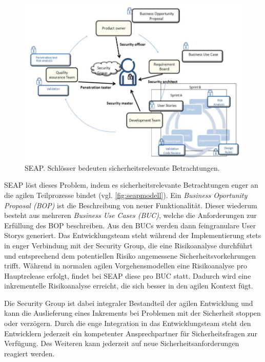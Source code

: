 \begin{figure}
  \centering
  \includegraphics[width=\textwidth]{img/seapmodell.png}
  \caption{SEAP. Schlösser bedeuten sicherheitsrelevante Betrachtungen. \parencite[][S. 14]{Baca:2015aa}}
  \label{fig:seapmodell}
\end{figure}

SEAP löst dieses Problem, indem es sicherheitsrelevante Betrachtungen enger an die agilen Teilprozesse bindet (vgl. \autoref{fig:seapmodell}).
Ein \emph{Business Oportunity Proposal (BOP)} ist die Beschreibung von neuer Funktionalität.
Dieser wiederum besteht aus mehreren \emph{Business Use Cases (BUC)}, welche die Anforderungen zur Erfüllung des BOP beschreiben.
Aus den BUCs werden dann feingranulare User Storys generiert.
Das Entwicklungsteam steht während der Implementierung stets in enger Verbindung mit der Security Group, die eine Risikoanalyse durchführt und entsprechend dem potentiellen Risiko angemessene Sicherheitsvorkehrungen trifft.
Während in normalen agilen Vorgehensmodellen eine Risikoanalyse pro Hauptrelease erfolgt, findet bei SEAP diese pro BUC statt.
Dadurch wird eine inkrementelle Risikoanalyse erreicht, die sich besser in den agilen Kontext fügt.
\parencite[Vgl.][S. 15]{Baca:2015aa}

Die Security Group ist dabei integraler Bestandteil der agilen Entwicklung und kann die Auslieferung eines Inkrements bei Problemen mit der Sicherheit stoppen oder verzögern. 
Durch die enge Integration in das Entwicklungsteam steht den Entwicklern jederzeit ein kompetenter Ansprechpartner für Sicherheitsfragen zur Verfügung.
Des Weiteren kann jederzeit auf neue Sicherheitsanforderungen reagiert werden.
\parencite[Vgl.][S. 15]{Baca:2015aa}

